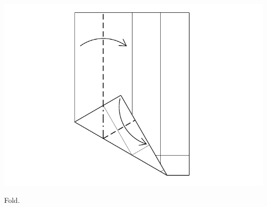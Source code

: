 \documentclass[11pt]{article}
\begin{document}
\begin{minipage}[t]{0.3\textwidth}
  \includegraphics[width=\textwidth]{../figs/fig06-06}
  \begin{itemize}{\item[6.] Fold.}\end{itemize}
\end{minipage}

\vspace*{0.5in}
\end{document}
